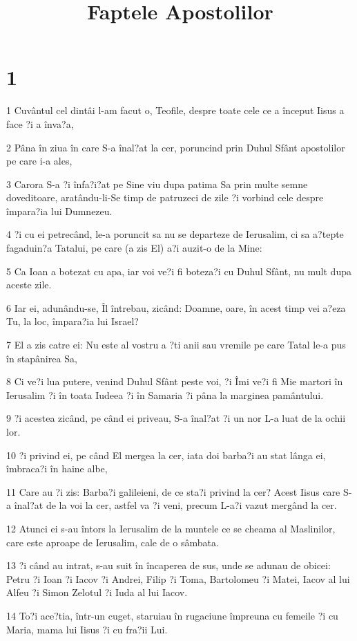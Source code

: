

\title{Faptele Apostolilor}


\chapter{1}

\par 1 Cuvântul cel dintâi l-am facut o, Teofile, despre toate cele ce a început Iisus a face ?i a înva?a,
\par 2 Pâna în ziua în care S-a înal?at la cer, poruncind prin Duhul Sfânt apostolilor pe care i-a ales,
\par 3 Carora S-a ?i înfa?i?at pe Sine viu dupa patima Sa prin multe semne doveditoare, aratându-li-Se timp de patruzeci de zile ?i vorbind cele despre împara?ia lui Dumnezeu.
\par 4 ?i cu ei petrecând, le-a poruncit sa nu se departeze de Ierusalim, ci sa a?tepte fagaduin?a Tatalui, pe care (a zis El) a?i auzit-o de la Mine:
\par 5 Ca Ioan a botezat cu apa, iar voi ve?i fi boteza?i cu Duhul Sfânt, nu mult dupa aceste zile.
\par 6 Iar ei, adunându-se, Îl întrebau, zicând: Doamne, oare, în acest timp vei a?eza Tu, la loc, împara?ia lui Israel?
\par 7 El a zis catre ei: Nu este al vostru a ?ti anii sau vremile pe care Tatal le-a pus în stapânirea Sa,
\par 8 Ci ve?i lua putere, venind Duhul Sfânt peste voi, ?i Îmi ve?i fi Mie martori în Ierusalim ?i în toata Iudeea ?i în Samaria ?i pâna la marginea pamântului.
\par 9 ?i acestea zicând, pe când ei priveau, S-a înal?at ?i un nor L-a luat de la ochii lor.
\par 10 ?i privind ei, pe când El mergea la cer, iata doi barba?i au stat lânga ei, îmbraca?i în haine albe,
\par 11 Care au ?i zis: Barba?i galileieni, de ce sta?i privind la cer? Acest Iisus care S-a înal?at de la voi la cer, astfel va ?i veni, precum L-a?i vazut mergând la cer.
\par 12 Atunci ei s-au întors la Ierusalim de la muntele ce se cheama al Maslinilor, care este aproape de Ierusalim, cale de o sâmbata.
\par 13 ?i când au intrat, s-au suit în încaperea de sus, unde se adunau de obicei: Petru ?i Ioan ?i Iacov ?i Andrei, Filip ?i Toma, Bartolomeu ?i Matei, Iacov al lui Alfeu ?i Simon Zelotul ?i Iuda al lui Iacov.
\par 14 To?i ace?tia, într-un cuget, staruiau în rugaciune împreuna cu femeile ?i cu Maria, mama lui Iisus ?i cu fra?ii Lui.
